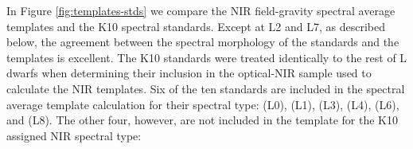 \documentclass[modern]{aastex61}
\begin{document}
In Figure \ref{fig:templates-stds} we compare the NIR field-gravity spectral average templates and the K10 spectral standards.
Except at L2 and L7, as described below, the agreement between the spectral morphology of the standards and the templates is excellent. The K10 standards were treated identically to the rest of L dwarfs when determining their inclusion in the optical-NIR sample used to calculate the NIR templates.
Six of the ten standards are included in the spectral average template calculation for their spectral type:  (L0),  (L1),  (L3),  (L4),  (L6), and  (L8).
The other four, however, are not included in the template for the K10 assigned NIR spectral type:
\end{document}
